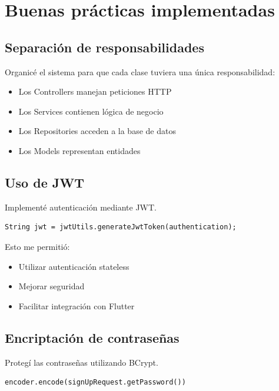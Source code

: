 \documentclass[12pt,a4paper]{article}
\begin{document}
\section{Buenas prácticas implementadas}

\subsection{Separación de responsabilidades}

Organicé el sistema para que cada clase tuviera una única responsabilidad:

\begin{itemize}
    \item Los Controllers manejan peticiones HTTP
    \item Los Services contienen lógica de negocio
    \item Los Repositories acceden a la base de datos
    \item Los Models representan entidades
\end{itemize}

\subsection{Uso de JWT}

Implementé autenticación mediante JWT.

\begin{lstlisting}
String jwt = jwtUtils.generateJwtToken(authentication);
\end{lstlisting}

Esto me permitió:

\begin{itemize}
    \item Utilizar autenticación stateless
    \item Mejorar seguridad
    \item Facilitar integración con Flutter
\end{itemize}

\subsection{Encriptación de contraseñas}

Protegí las contraseñas utilizando BCrypt.

\begin{lstlisting}
encoder.encode(signUpRequest.getPassword())
\end{lstlisting}
\end{document}
